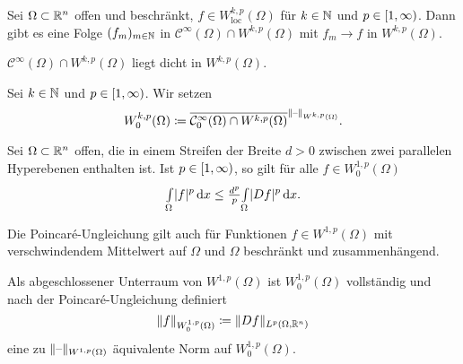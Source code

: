 \documentclass{cheat-sheet}
\begin{document}
\begin{satz}
  Sei $\Omega \subset \mathbb{R}^n$ offen und beschränkt, $f \in W^{k,p}_{\text{loc}}(\Omega)$ für $k \in \mathbb{N}$ und $p \in \left[ 1, \infty \right)$. Dann gibt es eine Folge $(f_m)_{m \in \mathbb{N}}$ in $\mathcal{C}^\infty(\Omega) \cap W^{k,p}(\Omega)$ mit $f_m \to f$ in $W^{k,p}(\Omega)$.
\end{satz}

\begin{kor}
  $\mathcal{C}^\infty(\Omega) \cap W^{k,p}(\Omega)$ liegt dicht in $W^{k,p}(\Omega)$.
\end{kor}



\begin{defn}
  Sei $k \in \mathbb{N}$ und $p \in \left[ 1, \infty \right)$. Wir setzen
  \[
    W^{k,p}_0(\Omega) \coloneqq \overline{\mathcal{C}_0^\infty(\Omega) \cap W^{k,p}(\Omega)}^{\lVert\text{--}\rVert_{W^{k,p}(\Omega)}}.
  \]
\end{defn}

\begin{satz}
  Sei $\Omega \subset \mathbb{R}^n$ offen, die in einem Streifen der Breite $d > 0$ zwischen zwei parallelen Hyperebenen enthalten ist. Ist $p \in \left[ 1, \infty \right)$, so gilt für alle $f \in W_0^{1,p}(\Omega)$
  \[
    {\textstyle \int\limits_{\Omega}^{}} \lvert f\rvert^p \,\mathrm{d} x \leq \tfrac{d^p}{p} {\textstyle \int\limits_{\Omega}^{}} \lvert D f\rvert^p \,\mathrm{d} x.
  \]
\end{satz}

\begin{bem}
  Die Poincaré-Ungleichung gilt auch für Funktionen $f \in W^{1,p}(\Omega)$ mit verschwindendem Mittelwert auf $\Omega$ und $\Omega$ beschränkt und zusammenhängend.
\end{bem}

\begin{bem}
  Als abgeschlossener Unterraum von $W^{1,p}(\Omega)$ ist $W^{1,p}_0(\Omega)$ vollständig und nach der Poincaré-Ungleichung definiert
  \[ \lVert f\rVert_{W_0^{1,p}(\Omega)} \coloneqq \lVert Df\rVert_{L^p(\Omega, \mathbb{R}^n)} \]
  eine zu $\lVert\text{--}\rVert_{W^{1,p}(\Omega)}$ äquivalente Norm auf $W^{1,p}_0(\Omega)$.
\end{bem}

\end{document}
